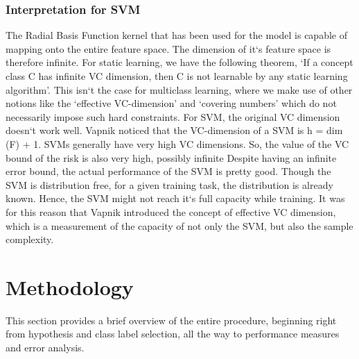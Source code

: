 \documentclass[letterpaper,12pt, onecolumn]{article}%
\begin{document}
\subsubsection*{Interpretation for SVM} 
The Radial Basis Function kernel that has been used for the model is capable of mapping onto the entire feature space. The dimension of it`s feature space is therefore infinite. For static learning, we have the following theorem, \enquote*{If a concept class C has infinite VC dimension, then C is not learnable by any static learning algorithm}. This isn`t the case for multiclass learning, where we make use of other notions like the \enquote*{effective VC-dimension} and \enquote*{covering numbers} which do not necessarily impose such hard constraints. For SVM, the original VC dimension doesn`t work well. Vapnik noticed that the VC-dimension of a SVM is 	h = dim (F) + 1.				
SVMs generally have very high VC dimensions. So, the value of the VC bound of the risk is also very high, possibly infinite Despite having an infinite error bound, the actual performance of the SVM is pretty good. Though the SVM is distribution free, for a given training task, the distribution is already known. Hence, the SVM might not reach it`s full capacity while training. It was for this reason that Vapnik introduced the concept of effective VC dimension, which is a measurement of the capacity of not only the SVM, but also the sample complexity. 


\section{Methodology} \label{sec:methodology}
\noindent
This section provides a brief overview of the entire procedure, beginning right from hypothesis and class label selection, all the way to performance measures and error analysis. 
\end{document}
